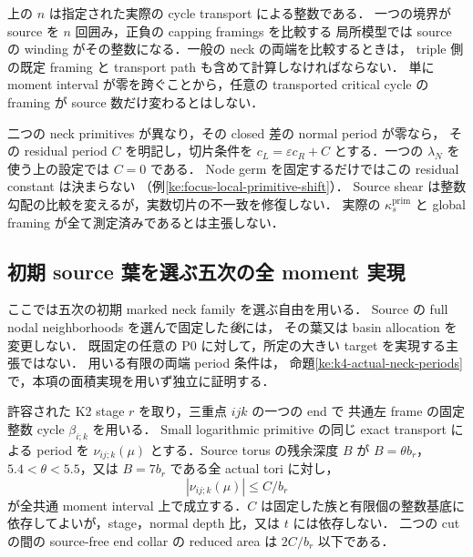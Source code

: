 \begin{remark}
上の $n$ は指定された実際の cycle transport による整数である．
一つの境界が source を $n$ 回囲み，正負の capping framings を比較する
局所模型では source の winding がその整数になる．一般の neck の両端を比較するときは，
triple 側の既定 framing と transport path も含めて計算しなければならない．
単に moment interval が零を跨ぐことから，任意の transported critical cycle の
framing が source 数だけ変わるとはしない．

二つの neck primitives が異なり，その closed 差の normal period が零なら，
その residual period $C$ を明記し，切片条件を
$c_L=\varepsilon c_R+C$ とする．一つの $\lambda_N$ を使う上の設定では $C=0$ である．
Node germ を固定するだけではこの residual constant は決まらない
（例\ref{ke:focus-local-primitive-shift}）．
Source shear は整数勾配の比較を変えるが，実数切片の不一致を修復しない．
実際の $\kappa_s^{\mathrm{prim}}$ と global framing が全て測定済みであるとは主張しない．
\end{remark}

\subsection{初期 source 葉を選ぶ五次の全 moment 実現}
\label{ng8:quintic-full-moment-section}

ここでは五次の初期 marked neck family を選ぶ自由を用いる．
Source の full nodal neighborhoods を選んで固定した\emph{後}には，
その葉又は basin allocation を変更しない．
既固定の任意の P0 に対して，所定の大きい target を実現する主張ではない．
用いる有限の両端 period 条件は，
命題\ref{ke:k4-actual-neck-periods}で，本項の面積実現を用いず独立に証明する．

\begin{lemma}
\label{ng8:uniform-k2-end-periods}
許容された K2 stage $r$ を取り，三重点 $ijk$ の一つの end で
共通左 frame の固定整数 cycle $\beta_{i;k}$ を用いる．
Small logarithmic primitive の同じ exact transport による period を
$\nu_{ij;k}(\mu)$ とする．Source torus の残余深度 $B$ が
$B=\theta b_r$，$5.4<\theta<5.5$，又は $B=7b_r$ である全 actual tori に対し，
\[
 |\nu_{ij;k}(\mu)|\le C/b_r
\]
が全共通 moment interval 上で成立する．$C$ は固定した族と有限個の整数基底に
依存してよいが，stage，normal depth 比，又は $t$ には依存しない．
二つの cut の間の source-free end collar の reduced area は $2C/b_r$ 以下である．
\end{lemma}


